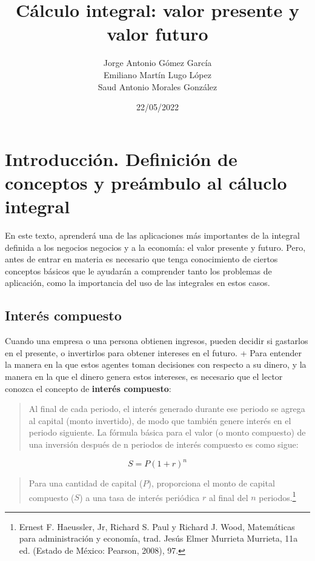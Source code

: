 \documentclass{article}
\title{Cálculo integral: valor presente y valor futuro}
\author{
    Jorge Antonio Gómez García \\
    Emiliano Martín Lugo López \\
    Saud Antonio Morales González}
\date{22/05/2022}
\begin{document}
\maketitle
    \section{Introducción. Definición de conceptos y preámbulo al cáluclo integral}

        En este texto, aprenderá una de las aplicaciones más importantes de la integral definida a los negocios negocios y a la economía: el valor presente y futuro. Pero, antes de entrar en materia es necesario que tenga conocimiento de ciertos conceptos básicos que le ayudarán a comprender tanto los problemas de aplicación, como la importancia del uso de las integrales en estos casos.

        \subsection{Interés compuesto}

            Cuando una empresa o una persona obtienen ingresos, pueden decidir si gastarlos en el presente, o invertirlos para obtener intereses en el futuro. +
            Para entender la manera en la que estos agentes toman decisiones con respecto a su dinero, y la manera en la que el dinero genera estos intereses, es necesario que el lector conozca el concepto de \textbf{interés compuesto}:

            \begin{quote}
                Al final de cada periodo, el interés generado durante ese periodo se agrega al capital (monto invertido), de modo que también genere interés en el periodo siguiente. La fórmula básica para el valor (o monto compuesto) de una inversión después de n periodos de interés compuesto es como sigue:
            \end{quote}
            \begin{equation}
                S=P(1+r)^{n}
            \end{equation}

            \begin{quote}
                Para una cantidad de capital ($P$), proporciona el monto de capital compuesto ($S$) a una tasa de interés periódica $r$ al final del $n$ periodos.\footnote[1]{Ernest F. Haeussler, Jr, Richard S. Paul y Richard J. Wood, Matemáticas para administración y economía, trad. Jesús Elmer Murrieta Murrieta, 11a ed. (Estado de México: Pearson, 2008), 97.}
            \end{quote}
\end{document}
